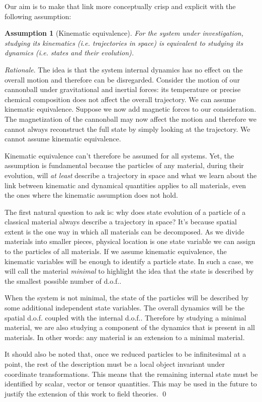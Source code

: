 \documentclass[aps,pra,10pt,twocolumn,floatfix,nofootinbib]{revtex4-1}
\numberwithin{equation}{section}
\newtheorem{assump}{Assumption}
\theoremstyle{definition}
\newenvironment{rationale}{\emph{Rationale}.}{\qed}
\begin{document}
Our aim is to make that link more conceptually crisp and explicit with the following assumption:

\begin{assump}[Kinematic equivalence]\label{ass:kinematic_equivalence}
	For the system under investigation, studying its kinematics  (i.e. trajectories in space) is equivalent to studying its dynamics  (i.e. states and their evolution).
\end{assump}

\begin{rationale}
	The idea is that the system internal dynamics has no effect on the overall motion and therefore can be disregarded. Consider the motion of our cannonball under gravitational and inertial forces: its temperature or precise chemical composition does not affect the overall trajectory. We can assume kinematic equivalence. Suppose we now add magnetic forces to our consideration. The magnetization of the cannonball may now affect the motion and therefore we cannot always reconstruct the full state by simply looking at the trajectory. We cannot assume kinematic equivalence.
	
	Kinematic equivalence can't therefore be assumed for all systems. Yet, the assumption is fundamental because the particles of any material, during their evolution, will \emph{at least} describe a trajectory in space and what we learn about the link between kinematic and dynamical quantities applies to all materials, even the ones where the kinematic assumption does not hold.
	
	The first natural question to ask is: why does state evolution of a particle of a classical material always describe a trajectory in space? It's because spatial extent is the one way in which all materials can be decomposed. As we divide materials into smaller pieces, physical location is one state variable we can assign to the particles of all materials. If we assume kinematic equivalence, the kinematic variables will be enough to identify a particle state. In such a case, we will call the material \emph{minimal} to highlight the idea that the state is described by the smallest possible number of d.o.f..
	
	When the system is not minimal, the state of the particles will be described by some additional independent state variables. The overall dynamics will be the spatial d.o.f. coupled with the internal d.o.f.. Therefore by studying a minimal material, we are also studying a component of the dynamics that is present in all materials. In other words: any material is an extension to a minimal material.
	
	It should also be noted that, once we reduced particles to be infinitesimal at a point, the rest of the description must be a local object invariant under coordinate transformations. This means that the remaining internal state must be identified by scalar, vector or tensor quantities. This may be used in the future to justify the extension of this work to field theories. 
\end{rationale}
\end{document}
